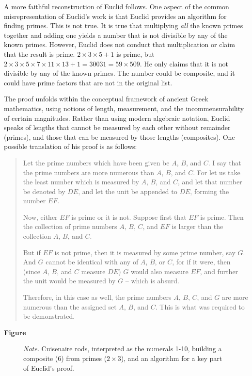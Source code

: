 \documentclass[12pt]{book}
\begin{document}
A more faithful reconstruction of Euclid follows. One aspect of the common misrepresentation of Euclid's work is that Euclid provides an algorithm for finding primes. This is not true. It is true that multiplying \textit{all} the known primes together and adding one yields a number that is not divisible by any of the known primes. However, Euclid does not conduct that multiplication or claim that the result is prime. $2\times 3 \times 5 + 1$ is prime, but $2\times 3 \times 5 \times 7\times 11\times 13+1=30031=59\times 509$. He only claims that it is not divisible by any of the known primes. The number could be composite, and it could have prime factors that are not in the original list.



The proof unfolds within the conceptual framework of ancient Greek mathematics, using notions of length, measurement, and the incommensurability of certain magnitudes. Rather than using modern algebraic notation, Euclid speaks of lengths that cannot be measured by each other without remainder (primes), and those that can be measured by those lengths (composites). One possible translation of his proof is as follows:

\begin{quote}
    Let the prime numbers which have been given be $A$, $B$, and $C$. I say that the prime numbers are more numerous than $A$, $B$, and $C$. For let us take the least number which is measured by $A$, $B$, and $C$, and let that number be denoted by $DE$, and let the unit be appended to $DE$, forming the number $EF$. 
    
    Now, either $EF$ is prime or it is not. Suppose first that $EF$ is prime. Then the collection of prime numbers $A$, $B$, $C$, and $EF$ is larger than the collection $A$, $B$, and $C$. 
    
    But if $EF$ is not prime, then it is measured by some prime number, say $G$. And $G$ cannot be identical with any of $A$, $B$, or $C$, for if it were, then (since $A$, $B$, and $C$ measure $DE$) $G$ would also measure $EF$, and further the unit would be measured by $G$  --  which is absurd. 
    
    Therefore, in this case as well, the prime numbers $A$, $B$, $C$, and $G$ are more numerous than the assigned set $A$, $B$, and $C$. This is what was required to be demonstrated.
\end{quote}

\textbf{Figure}

\begin{figure}[H]
	\caption{\textit{Note. }Cuisenaire rods, interpreted as the numerals 1-10, building a composite (6) from primes ($2\times 3$), and an algorithm for a key part of Euclid's proof.}
	\label{fig:rods}
\end{figure}
\end{document}
